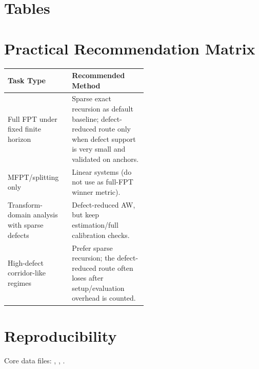 \documentclass[11pt]{article}
\begin{document}
\section{Tables}
\begin{table}[H]
\centering
\small
\caption{Runtime ratio summary by defect bin and horizon.}
\resizebox{\linewidth}{!}{}
\end{table}
\begin{table}[H]
\centering
\small
\caption{Anchor workload runtime baselines.}
\resizebox{\linewidth}{!}{}
\end{table}
\clearpage
\section{Practical Recommendation Matrix}
\begin{table}[H]
\centering
\small
\begin{tabular}{@{}l>{\raggedright\arraybackslash}p{0.54\linewidth}@{}}
\toprule
Task Type & Recommended Method \\
\midrule
Full FPT under fixed finite horizon & Sparse exact recursion as default baseline; defect-reduced route only when defect support is very small and validated on anchors. \\
MFPT/splitting only & Linear systems (do not use as full-FPT winner metric). \\
Transform-domain analysis with sparse defects & Defect-reduced AW, but keep estimation/full calibration checks. \\
High-defect corridor-like regimes & Prefer sparse recursion; the defect-reduced route often loses after setup/evaluation overhead is counted. \\
\bottomrule
\end{tabular}
\end{table}
\section{Reproducibility}
Core data files: , , .
\end{document}
